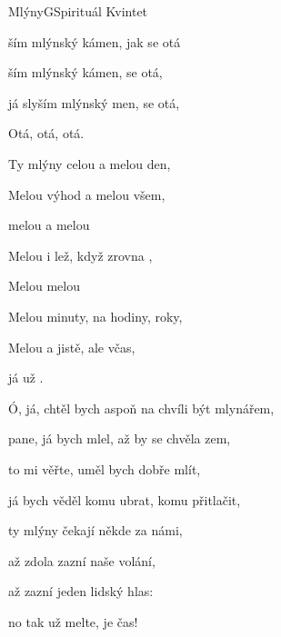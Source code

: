 \setcounter{page}{52}
\begin{song}{Mlýny}{G}{Spirituál Kvintet}

\begin{SBChorus}

ším mlýnský kámen, jak se otá

ším mlýnský kámen,  se otá,

já slyším mlýnský men,  se otá,

Otá, otá, otá.

\end{SBChorus}

\begin{SBVerse}

Ty mlýny  celou  a melou  den,

Melou  výhod a melou  všem,

melou  a melou 

Melou  i lež, když zrovna ,

Melou  melou 

Melou  minuty, na hodiny,  roky,

Melou  a jistě, ale  včas,

já už   .

\end{SBVerse}

\begin{SBChorus}

\end{SBChorus}

\begin{SBVerse}

Ó, já, chtěl bych aspoň na chvíli být mlynářem,

pane, já bych mlel, až by se chvěla zem,

to mi věřte, uměl bych dobře mlít,

já bych věděl komu ubrat, komu přitlačit,

ty mlýny čekají někde za námi,

až zdola zazní naše volání,

až zazní jeden lidský hlas:

no tak už melte, je čas!

\end{SBVerse}

\begin{SBChorus}

\end{SBChorus}

\end{song}

\clearpage
